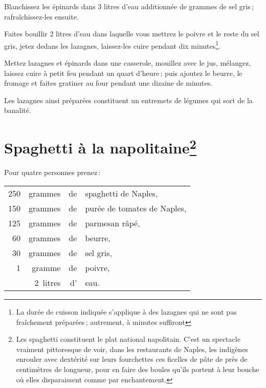 Blanchissez les épinards dans 3 litres d'eau additionnée de {\mmm}
grammes de sel gris ; rafraîchissez-les ensuite.

Faites bouillir 2 litres d'eau dans laquelle vous mettrez le poivre et le reste
du sel gris, jetez dedans les lazagnes, laissez-les cuire pendant dix
minutes\footnote{La durée de cuisson indiquée s'applique à des lazagnes qui ne
sont pas fraîchement préparées ; autrement, {\mmm} à {\mmm} minutes
suffiront}.

Mettez lazagnes et épinards dans une casserole, mouillez avec le jus, mélangez,
laissez cuire à petit feu pendant un quart d'heure ; puis ajoutez le beurre, le
fromage et faites gratiner au four pendant une dizaine de minutes.

Les lazagnes ainsi préparées constituent un entremets de légumes qui sort de la
banalité.

\section*{\centering Spaghetti à la napolitaine\footnote{Les spaghetti
constituent le plat national napolitain.
\protect\endgraf
C'est un spectacle vraiment pittoresque de voir, dans les restaurants de
Naples, les indigènes enrouler avec dextérité sur leurs fourchettes ces
ficelles de pâte de près de {\mmm} centimètres de longueur, pour en faire
des boules qu'ils portent à leur bouche où elles disparaissent comme par
enchantement.}}
{}

Pour quatre personnes prenez :

\footnotesize
\begin{longtable}{rrrp{16em}}
    250 & grammes  & de & spaghetti de Naples,                                                            \\
    150 & grammes  & de & purée de tomates de Naples,                                                     \\
    125 & grammes  & de & parmesan râpé,                                                                  \\
     60 & grammes  & de & beurre,                                                                         \\
     30 & grammes  & de & sel gris,                                                                       \\
      1 & gramme   & de & poivre,                                                                         \\
        & 2 litres & d' & eau.                                                                            \\
\end{longtable}
\normalsize

